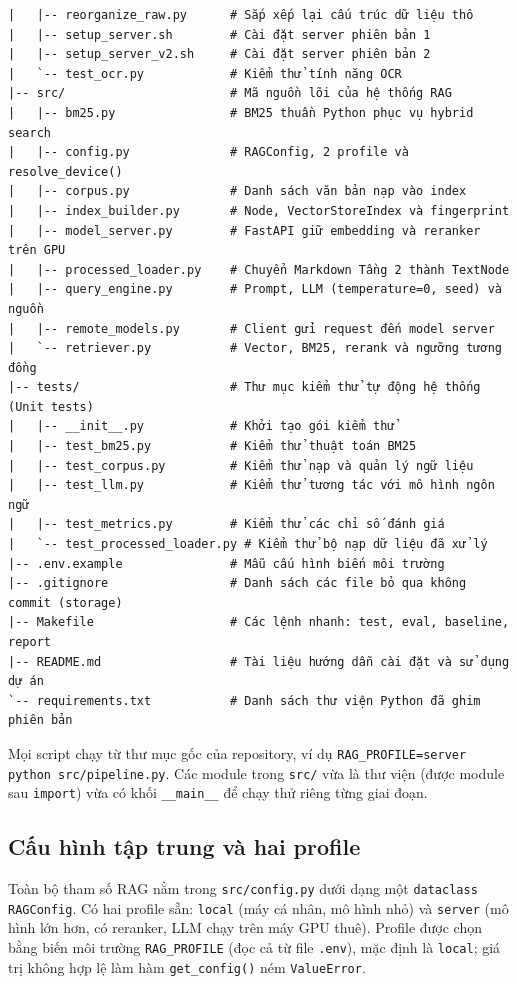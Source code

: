 \begin{lstlisting}[caption={Cấu trúc thư mục dự án.}, label={lst:cau-truc-thu-muc}]
|   |-- reorganize_raw.py      # Sắp xếp lại cấu trúc dữ liệu thô
|   |-- setup_server.sh        # Cài đặt server phiên bản 1
|   |-- setup_server_v2.sh     # Cài đặt server phiên bản 2
|   `-- test_ocr.py            # Kiểm thử tính năng OCR
|-- src/                       # Mã nguồn lõi của hệ thống RAG
|   |-- bm25.py                # BM25 thuần Python phục vụ hybrid search
|   |-- config.py              # RAGConfig, 2 profile và resolve_device()
|   |-- corpus.py              # Danh sách văn bản nạp vào index
|   |-- index_builder.py       # Node, VectorStoreIndex và fingerprint
|   |-- model_server.py        # FastAPI giữ embedding và reranker trên GPU
|   |-- processed_loader.py    # Chuyển Markdown Tầng 2 thành TextNode
|   |-- query_engine.py        # Prompt, LLM (temperature=0, seed) và nguồn
|   |-- remote_models.py       # Client gửi request đến model server
|   `-- retriever.py           # Vector, BM25, rerank và ngưỡng tương đồng
|-- tests/                     # Thư mục kiểm thử tự động hệ thống (Unit tests)
|   |-- __init__.py            # Khởi tạo gói kiểm thử
|   |-- test_bm25.py           # Kiểm thử thuật toán BM25
|   |-- test_corpus.py         # Kiểm thử nạp và quản lý ngữ liệu
|   |-- test_llm.py            # Kiểm thử tương tác với mô hình ngôn ngữ
|   |-- test_metrics.py        # Kiểm thử các chỉ số đánh giá
|   `-- test_processed_loader.py # Kiểm thử bộ nạp dữ liệu đã xử lý
|-- .env.example               # Mẫu cấu hình biến môi trường
|-- .gitignore                 # Danh sách các file bỏ qua không commit (storage)
|-- Makefile                   # Các lệnh nhanh: test, eval, baseline, report
|-- README.md                  # Tài liệu hướng dẫn cài đặt và sử dụng dự án
`-- requirements.txt           # Danh sách thư viện Python đã ghim phiên bản
\end{lstlisting}

Mọi script chạy từ thư mục gốc của repository, ví dụ \texttt{RAG\_PROFILE=server python src/pipeline.py}. Các module trong \texttt{src/} vừa là thư viện (được module sau \texttt{import}) vừa có khối \texttt{\_\_main\_\_} để chạy thử riêng từng giai đoạn.

\subsection{Cấu hình tập trung và hai profile}

Toàn bộ tham số RAG nằm trong \texttt{src/config.py} dưới dạng một \texttt{dataclass} \texttt{RAGConfig}. Có hai profile sẵn: \texttt{local} (máy cá nhân, mô hình nhỏ) và \texttt{server} (mô hình lớn hơn, có reranker, LLM chạy trên máy GPU thuê). Profile được chọn bằng biến môi trường \texttt{RAG\_PROFILE} (đọc cả từ file \texttt{.env}), mặc định là \texttt{local}; giá trị không hợp lệ làm hàm \texttt{get\_config()} ném \texttt{ValueError}.

